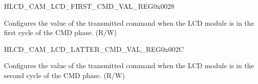 \begin{register}{H}{LCD\_CAM\_LCD\_FIRST\_CMD\_VAL\_REG}{0x0028}\label{regdesc:LCDCAMLCDFIRSTCMDVALREG}
%
\regnewline%
\begin{regdesc}\begin{reglist}
\label{fielddesc:LCDCAMLCDFIRSTCMDVALUE}\item [LCD\_CAM\_LCD\_FIRST\_CMD\_VALUE] Configures the value of the transmitted command when the LCD module is in the first cycle of the CMD phase. (R/W)
\end{reglist}\end{regdesc}
\end{register}

\begin{register}{H}{LCD\_CAM\_LCD\_LATTER\_CMD\_VAL\_REG}{0x002C}\label{regdesc:LCDCAMLCDLATTERCMDVALREG}
%
\regnewline%
\begin{regdesc}\begin{reglist}
\label{fielddesc:LCDCAMLCDLATTERCMDVALUE}\item [LCD\_CAM\_LCD\_LATTER\_CMD\_VALUE] Configures the value of the transmitted command when the LCD module is in the second cycle of the CMD phase. (R/W)
\end{reglist}\end{regdesc}
\end{register}

